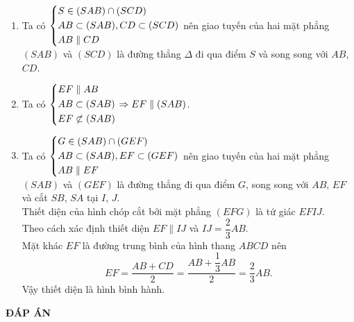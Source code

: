 \begin{bt}
{		\begin{enumerate}
			\item Ta có $\left\{\begin{aligned}&S \in (SAB) \cap (SCD)\\&AB \subset (SAB),CD \subset (SCD)\\&AB \parallel CD\end{aligned}\right.$ nên giao tuyến của hai mặt phẳng $(SAB)$ và $(SCD)$ là đường thẳng $\Delta$ đi qua điểm $S$ và song song với $AB$, $CD$.
			\item Ta có $\left\{\begin{aligned}&EF\parallel AB\\&AB\subset (SAB)\\&EF \not\subset (SAB)\end{aligned}\right. \Rightarrow EF \parallel (SAB)$.
			\item Ta có $\left\{\begin{aligned}&G \in (SAB) \cap (GEF)\\&AB \subset (SAB),EF \subset (GEF)\\&AB \parallel EF\end{aligned}\right.$ nên giao tuyến của hai mặt phẳng $(SAB)$ và $(GEF)$ là đường thẳng đi qua điểm $G$, song song với $AB$, $EF$ và cắt $SB$, $SA$ tại $I$, $J$.\\
			Thiết diện của hình chóp cắt bởi mặt phẳng $(EFG)$ là tứ giác $EFIJ$.\\
			Theo cách xác định thiết diện $EF \parallel IJ$ và $IJ=\dfrac{2}{3}AB$.\\
			Mặt khác $EF$ là đường trung bình của hình thang $ABCD$ nên $$EF=\dfrac{AB+CD}{2}=\dfrac{AB+\dfrac{1}{3}AB}{2}=\dfrac{2}{3}AB.$$
			Vậy thiết diện là hình bình hành.						
		\end{enumerate}
	}
\end{bt}

\newpage
\begin{center}
	\textbf{ĐÁP ÁN}
\end{center}
\begin{multicols}{10}
	
\end{multicols}